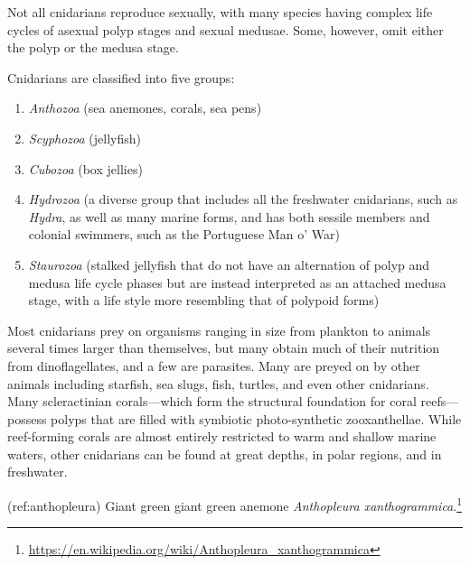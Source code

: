 \documentclass[]{book}
\providecommand{\tightlist}{%
  \setlength{\itemsep}{0pt}\setlength{\parskip}{0pt}}
\let\rmarkdownfootnote\footnote%
\def\footnote{\protect\rmarkdownfootnote}
\renewcommand{\href}[2]{#2\footnote{\url{#1}}}
\theoremstyle{definition}
\theoremstyle{definition}
\theoremstyle{definition}
\theoremstyle{remark}
\begin{document}
Not all cnidarians reproduce sexually, with many species having complex
life cycles of asexual polyp stages and sexual medusae. Some, however,
omit either the polyp or the medusa stage.

Cnidarians are classified into five groups:

\begin{enumerate}
\def\labelenumi{\arabic{enumi}.}
\tightlist
\item
  \emph{Anthozoa} (sea anemones, corals, sea pens)
\item
  \emph{Scyphozoa} (jellyfish)
\item
  \emph{Cubozoa} (box jellies)
\item
  \emph{Hydrozoa} (a diverse group that includes all the freshwater
  cnidarians, such as \emph{Hydra}, as well as many marine forms, and
  has both sessile members and colonial swimmers, such as the Portuguese
  Man o' War)
\item
  \emph{Staurozoa} (stalked jellyfish that do not have an alternation of
  polyp and medusa life cycle phases but are instead interpreted as an
  attached medusa stage, with a life style more resembling that of
  polypoid forms)
\end{enumerate}

Most cnidarians prey on organisms ranging in size from plankton to
animals several times larger than themselves, but many obtain much of
their nutrition from dinoflagellates, and a few are parasites. Many are
preyed on by other animals including starfish, sea slugs, fish, turtles,
and even other cnidarians. Many scleractinian corals---which form the
structural foundation for coral reefs---possess polyps that are filled
with symbiotic photo-synthetic zooxanthellae. While reef-forming corals
are almost entirely restricted to warm and shallow marine waters, other
cnidarians can be found at great depths, in polar regions, and in
freshwater.

(ref:anthopleura)
\href{https://en.wikipedia.org/wiki/Anthopleura_xanthogrammica}{Giant
green giant green anemone \emph{Anthopleura xanthogrammica}.}
\end{document}
